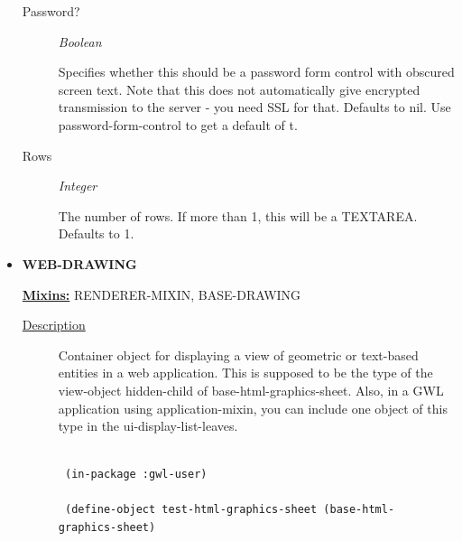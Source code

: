 \documentclass [11pt]{book}
\begin{document}
\begin{itemize}
\begin{description}
\item [Password?]
\emph{Boolean}

 Specifies whether this should be a password form control with obscured screen text.
Note that this does not automatically give encrypted transmission to the server - you need SSL
for that. Defaults to nil. Use password-form-control to get a default of t.




\item [Rows]
\emph{Integer}

 The number of rows. If more than 1, this will be a TEXTAREA. Defaults to 1.




\end{description}







\item {}
\label{prim:web-drawing}
\textbf{WEB-DRAWING}


\textbf{
\underline{Mixins:}} RENDERER-MIXIN, BASE-DRAWING





\begin{description}

\item [
\underline{Description}]


Container object for displaying a view of geometric 
or text-based entities in a web application. This is supposed to be the type of the
view-object hidden-child of base-html-graphics-sheet. Also, in a GWL application using 
application-mixin, you can include one object of this type in the ui-display-list-leaves.




\end{description}




\begin{figure}
\begin{lrbox}{\boxedverb}
\begin{minipage}{\linewidth}
{\small

\begin{verbatim}

 (in-package :gwl-user)

 (define-object test-html-graphics-sheet (base-html-graphics-sheet)
    

\end{verbatim}}
\end{minipage}
\end{lrbox}
\end{figure}
\end{itemize}
\end{document}
